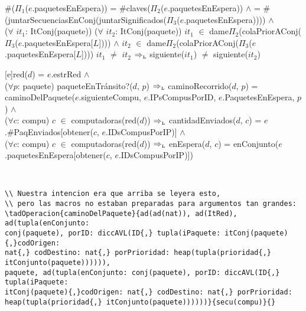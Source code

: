 \begin{Representacion}
{%
    \#($\Pi_1$($e$.paquetesEnEspera)) = \#claves($\Pi_2$($e$.paquetesEnEspera)) $\land$ = \#(juntarSecuenciasEnConj(juntarSignificados($\Pi_3$($e$.paquetesEnEspera)))) $\land$ \\

    ($\forall$ $it_{1}$: ItConj(paquete)) ($\forall$ $it_{2}$: ItConj(paquete)) $it_{1}$ $\in$ dame$\Pi_{2}$(colaPriorAConj($\Pi_{3}$($e$.paquetesEnEspera[$L$]))) $\land$ $it_{2}$ $\in$ dame$\Pi_{2}$(colaPriorAConj($\Pi_{3}$($e$.paquetesEnEspera[$L$]))) $it_{1}$ $\neq$ $it_{2}$ $\Rightarrow_{\mathrm{\scriptscriptstyle{L}}}$ siguiente($it_{1}$) $\neq$ siguiente($it_{2}$)
    }\mbox{} %


[e]{red($d$) = $e$.estrRed $\land$ \\

  ($\forall p$: paquete) paqueteEnTr\'ansito?($d$, $p$) $\Rightarrow_{\mathrm{\scriptscriptstyle{L}}}$ caminoRecorrido($d$, $p$) = caminoDelPaquete($e$.siguienteCompu, $e$.IPsCompusPorID, $e$.PaquetesEnEspera, $p$) $\land$ \\

  ($\forall c$: compu) $c$ $\in$ computadoras(red($d$)) $\Rightarrow_{\mathrm{\scriptscriptstyle{L}}}$ cantidadEnviados($d$, $c$) = $e$.\#PaqEnviados[obtener($c$, $e$.IDsCompusPorIP)] $\land$ \\

  ($\forall c$: compu) $c$ $\in$ computadoras(red($d$)) $\Rightarrow_{\mathrm{\scriptscriptstyle{L}}}$ enEspera($d$, $c$) = enConjunto($e$.paquetesEnEspera[obtener($c$, $e$.IDsCompusPorIP)])
}

  ~      


\small\begin{verbatim}
\\ Nuestra intencion era que arriba se leyera esto,
\\ pero las macros no estaban preparadas para argumentos tan grandes:
\tadOperacion{caminoDelPaquete}{ad(ad(nat)), ad(ItRed), ad(tupla(enConjunto:
conj(paquete), porID: diccAVL(ID{,} tupla(iPaquete: itConj(paquete){,}codOrigen:
nat{,} codDestino: nat{,} porPrioridad: heap(tupla(prioridad{,} itConjunto(paquete)))))),
paquete, ad(tupla(enConjunto: conj(paquete), porID: diccAVL(ID{,} tupla(iPaquete:
itConj(paquete){,}codOrigen: nat{,} codDestino: nat{,} porPrioridad:
heap(tupla(prioridad{,} itConjunto(paquete))))))}{secu(compu)}{}
\end{verbatim}


\end{Representacion}
